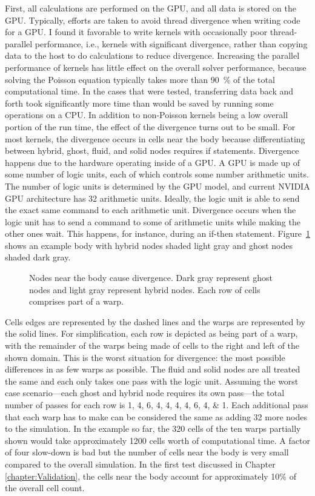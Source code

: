 First, all calculations are performed on the GPU, and all data is stored on the GPU.
Typically, efforts are taken to avoid thread divergence when writing code for a GPU. 
I found it favorable to write kernels with occasionally poor thread-parallel performance, i.e., kernels with significant divergence, rather than copying data to the host to do calculations to reduce divergence. 
Increasing the parallel performance of kernels has little effect on the overall solver performance, because solving the Poisson equation typically takes more than \SI{90}{\percent} of the total computational time. 
In the cases that were tested, transferring data back and forth took significantly more time than would be saved by running some operations on a CPU. 
In addition to non-Poisson kernels being a low overall portion of the run time, the effect of the divergence turns out to be small. 
For most kernels, the divergence occurs in cells near the body because differentiating between hybrid, ghost, fluid, and solid nodes requires if statements. 
Divergence happens due to the hardware operating inside of a GPU. 
A GPU is made up of some number of logic units, each of which controls some number arithmetic units. 
The number of logic units is determined by the GPU model, and current NVIDIA GPU architecture has 32 arithmetic units. 
Ideally, the logic unit is able to send the exact same command to each arithmetic unit. 
Divergence occurs when the logic unit has to send a command to some of arithmetic units while making the other ones wait. 
This happens, for instance, during an if-then statement. 
Figure~\ref{fig:divergence} shows an example body with hybrid nodes shaded light gray and ghost nodes shaded dark gray. 
\begin{figure}[!htb]
	\centering
	
	\caption{Nodes near the body cause divergence. Dark gray represent ghost nodes and light gray represent hybrid nodes. Each row of cells comprises part of a warp.}
	\label{fig:divergence}
\end{figure}
Cells edges are represented by the dashed lines and the warps are represented by the solid lines. 
For simplification, each row is depicted as being part of a warp, with the remainder of the warps being made of cells to the right and left of the shown domain. 
This is the worst situation for divergence: the most possible differences in as few warps as possible. 
The fluid and solid nodes are all treated the same and each only takes one pass with the logic unit. 
Assuming the worst case scenario---each ghost and hybrid node requires its own pass---the total number of passes for each row is \numlist{1;4;6;4;4;4;4;6;4;1}. 
Each additional pass that each warp has to make can be considered the same as adding 32 more nodes to the simulation. 
In the example so far, the 320 cells of the ten warps partially shown would take approximately 1200 cells worth of computational time. 
A factor of four slow-down is bad but the number of cells near the body is very small compared to the overall simulation. 
In the first test discussed in Chapter \ref{chapter:Validation}, the cells near the body account for approximately 10\% of the overall cell count.


